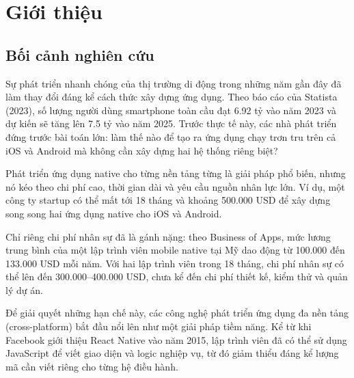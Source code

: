
\section{Giới thiệu}
\subsection{Bối cảnh nghiên cứu}
\renewcommand{\labelitemi}{--}    
\begin{flushleft}
    \hspace*{0.8cm}Sự phát triển nhanh chóng của thị trường di động trong những năm gần đây đã làm thay đổi đáng kể cách thức xây dựng ứng dụng. Theo báo cáo của Statista (2023), số lượng người dùng smartphone toàn cầu đạt 6.92 tỷ vào năm 2023 và dự kiến sẽ tăng lên 7.5 tỷ vào năm 2025. Trước thực tế này, các nhà phát triển đứng trước bài toán lớn: làm thế nào để tạo ra ứng dụng chạy trơn tru trên cả iOS và Android mà không cần xây dựng hai hệ thống riêng biệt?
\end{flushleft}

\begin{flushleft}
    \hspace*{0.8cm}Phát triển ứng dụng native cho từng nền tảng từng là giải pháp phổ biến, nhưng nó kéo theo chi phí cao, thời gian dài và yêu cầu nguồn nhân lực lớn. Ví dụ, một công ty startup có thể mất tới 18 tháng và khoảng 500.000 USD để xây dựng song song hai ứng dụng native cho iOS và Android.
\end{flushleft}

\begin{flushleft}
    \hspace*{0.8cm}Chỉ riêng chi phí nhân sự đã là gánh nặng: theo Business of Apps, mức lương trung bình của một lập trình viên mobile native tại Mỹ dao động từ 100.000 đến 133.000 USD mỗi năm. Với hai lập trình viên trong 18 tháng, chi phí nhân sự có thể lên đến 300.000--400.000 USD, chưa kể đến chi phí thiết kế, kiểm thử và quản lý dự án.
\end{flushleft}

\begin{flushleft}
    \hspace*{0.8cm}Để giải quyết những hạn chế này, các công nghệ phát triển ứng dụng đa nền tảng (cross-platform) bắt đầu nổi lên như một giải pháp tiềm năng. Kể từ khi Facebook giới thiệu React Native vào năm 2015, lập trình viên đã có thể sử dụng JavaScript để viết giao diện và logic nghiệp vụ, từ đó giảm thiểu đáng kể lượng mã cần viết riêng cho từng hệ điều hành.
\end{flushleft}

